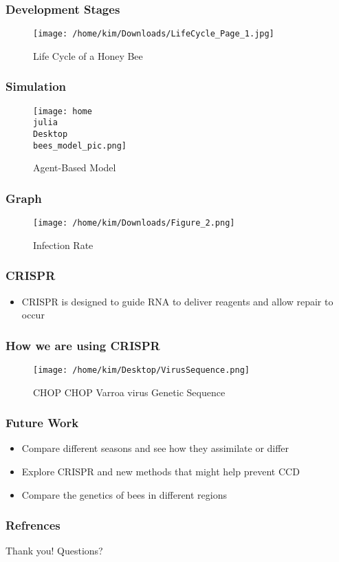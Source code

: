 \documentclass{beamer}
\begin{document}
\begin{frame}
  \frametitle{Development Stages}

  \begin{figure}
  \centering
      \texttt{[image: /home/kim/Downloads/LifeCycle\_Page\_1.jpg]}
      \caption{Life Cycle of a Honey Bee}
      \label{Life Cycle}
  \centering
  \end{figure}
\end{frame}


\begin{frame}
  \frametitle{Simulation}
  \begin{figure}
    \centering
    \texttt{[image: home\\julia\\Desktop\\bees\_model\_pic.png]}
    \caption{Agent-Based Model}
    \label{Agent-Based Model}
    \centering
  \end{figure}
  

\end{frame}

\begin{frame}
  \frametitle{Graph}
  \begin{figure}
  \centering
    \texttt{[image: /home/kim/Downloads/Figure\_2.png]}
    \caption{Infection Rate}
    \label{Infection Rate}
  \centering
  \end{figure}
\end{frame}

\begin{frame}
  \frametitle{CRISPR}
  \begin{itemize}
  \item CRISPR is designed to guide RNA to deliver reagents and allow repair to occur
  \end{itemize}
\end{frame}

\begin{frame}
  \frametitle{How we are using CRISPR}
  \begin{figure}
  \centering
    \texttt{[image: /home/kim/Desktop/VirusSequence.png]}
    \caption{CHOP CHOP Varroa virus Genetic Sequence}
    \label{CHOP CHOP}
  \centering
  \end{figure}
\end{frame}

\begin{frame}
  \frametitle{Future Work}
  \begin{itemize}
  \item Compare different seasons and see how they assimilate or differ
  \item Explore CRISPR and new methods that might help prevent CCD
  \item Compare the genetics of bees in different regions
  \end{itemize}
  
\end{frame}

\begin{frame}
  \frametitle{Refrences}

\end{frame}

\begin{frame}
Thank you!
Questions?
\end{frame}
\end{document}
